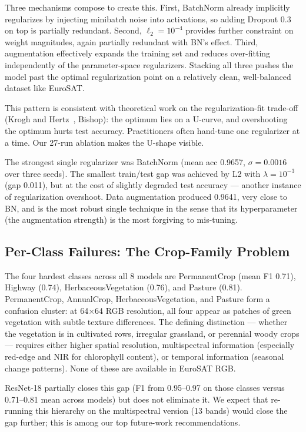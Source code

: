 \documentclass[10pt,letterpaper]{article}
\begin{document}
Three mechanisms compose to create this. First, BatchNorm already implicitly regularizes by injecting minibatch noise into activations, so adding Dropout 0.3 on top is partially redundant. Second, $\ell_2 = 10^{-4}$ provides further constraint on weight magnitudes, again partially redundant with BN's effect. Third, augmentation effectively expands the training set and reduces over-fitting independently of the parameter-space regularizers. Stacking all three pushes the model past the optimal regularization point on a relatively clean, well-balanced dataset like EuroSAT.

This pattern is consistent with theoretical work on the regularization-fit trade-off (Krogh and Hertz~\cite{krogh1992}, Bishop): the optimum lies on a U-curve, and overshooting the optimum hurts test accuracy. Practitioners often hand-tune one regularizer at a time. Our 27-run ablation makes the U-shape visible.

The strongest single regularizer was BatchNorm (mean acc 0.9657, $\sigma{=}0.0016$ over three seeds). The smallest train/test gap was achieved by L2 with $\lambda{=}10^{-3}$ (gap 0.011), but at the cost of slightly degraded test accuracy --- another instance of regularization overshoot. Data augmentation produced 0.9641, very close to BN, and is the most robust single technique in the sense that its hyperparameter (the augmentation strength) is the most forgiving to mis-tuning.

\subsection{Per-Class Failures: The Crop-Family Problem}
The four hardest classes across all 8 models are PermanentCrop (mean F1 0.71), Highway (0.74), HerbaceousVegetation (0.76), and Pasture (0.81). PermanentCrop, AnnualCrop, HerbaceousVegetation, and Pasture form a confusion cluster: at 64$\times$64 RGB resolution, all four appear as patches of green vegetation with subtle texture differences. The defining distinction --- whether the vegetation is in cultivated rows, irregular grassland, or perennial woody crops --- requires either higher spatial resolution, multispectral information (especially red-edge and NIR for chlorophyll content), or temporal information (seasonal change patterns). None of these are available in EuroSAT RGB.

ResNet-18 partially closes this gap (F1 from 0.95--0.97 on those classes versus 0.71--0.81 mean across models) but does not eliminate it. We expect that re-running this hierarchy on the multispectral version (13 bands) would close the gap further; this is among our top future-work recommendations.
\end{document}
